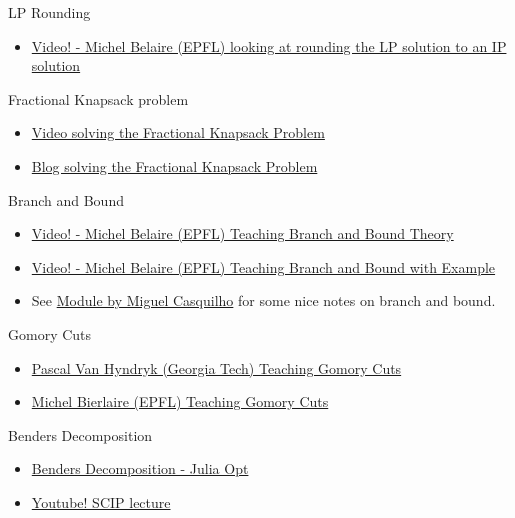 \begin{resource}
LP Rounding
\begin{itemize}
\item  \href{https://youtu.be/Az7HUuq4SOI?t=189}{Video! - Michel Belaire (EPFL) looking at rounding the LP solution to an IP solution}
\end{itemize}

Fractional Knapsack problem
\begin{itemize}
\item \href{https://youtu.be/m1p-eWxrt6g}{Video solving the Fractional Knapsack Problem}
\item \href{https://www.geeksforgeeks.org/fractional-knapsack-problem/}{Blog solving the Fractional Knapsack Problem}
\end{itemize}

Branch and Bound
\begin{itemize}
\item \href{https://www.youtube.com/watch?v=SdXPNaID-T8}{Video! -  Michel Belaire (EPFL) Teaching Branch and Bound Theory}
\item \href{https://www.youtube.com/watch?v=nKXZYQUtvAY}{Video! -  Michel Belaire (EPFL) Teaching Branch and Bound with Example}
\item See \href{http://web.tecnico.ulisboa.pt/mcasquilho/compute/_linpro/TaylorB_module_c.pdf}{Module by Miguel Casquilho} for some nice notes on branch and bound.
\end{itemize}

Gomory Cuts
\begin{itemize}
\item \href{https://www.youtube.com/watch?v=1i0rKtH_YPs&list=PLNMgVqt8MREx6Nex1Q9003vrZem-JXNvX&index=28&ab_channel=EducationalDocumentaries}{Pascal Van Hyndryk (Georgia Tech) Teaching Gomory Cuts}
\item \href{https://www.youtube.com/watch?v=VdXHGNDnjjo}{Michel Bierlaire (EPFL) Teaching Gomory Cuts}
\end{itemize}

Benders Decomposition
\begin{itemize}
\item \href{https://www.juliaopt.org/notebooks/Shuvomoy%20-%20Benders%20decomposition.html}{Benders Decomposition - Julia Opt}
\item \href{https://www.youtube.com/watch?v=8vUNXHwVnC8}{Youtube!  SCIP lecture}
\end{itemize}
\end{resource}


%
